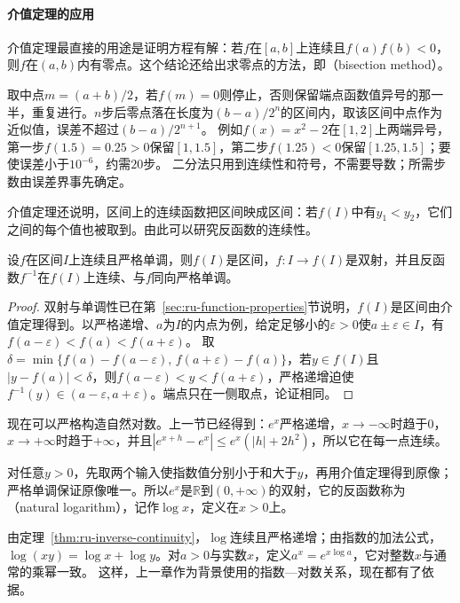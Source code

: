 \paragraph{介值定理的应用}
介值定理最直接的用途是证明方程有解：若$f$在$[a,b]$上连续且$f(a)f(b)<0$，则$f$在$(a,b)$内有零点。这个结论还给出求零点的方法，即（bisection method）。

取中点$m=(a+b)/2$，若$f(m)=0$则停止，否则保留端点函数值异号的那一半，重复进行。$n$步后零点落在长度为$(b-a)/2^n$的区间内，取该区间中点作为近似值，误差不超过$(b-a)/2^{n+1}$。
例如$f(x)=x^2-2$在$[1,2]$上两端异号，第一步$f(1.5)=0.25>0$保留$[1,1.5]$，第二步$f(1.25)<0$保留$[1.25,1.5]$；要使误差小于$10^{-6}$，约需$20$步。
二分法只用到连续性和符号，不需要导数；所需步数由误差界事先确定。

介值定理还说明，区间上的连续函数把区间映成区间：若$f(I)$中有$y_1<y_2$，它们之间的每个值也被取到。由此可以研究反函数的连续性。
\begin{theorem}[严格单调连续函数的反函数]
\label{thm:ru-inverse-continuity}
\label{sec:analysis-inverse-continuity}
设$f$在区间$I$上连续且严格单调，则$f(I)$是区间，$f:I\to f(I)$是双射，并且反函数$f^{-1}$在$f(I)$上连续、与$f$同向严格单调。
\end{theorem}
\begin{proof}
双射与单调性已在第~\ref{sec:ru-function-properties}节说明，$f(I)$是区间由介值定理得到。以严格递增、$a$为$I$的内点为例，给定足够小的$\varepsilon>0$使$a\pm\varepsilon\in I$，有$f(a-\varepsilon)<f(a)<f(a+\varepsilon)$。
取$\delta=\min\{f(a)-f(a-\varepsilon),\,f(a+\varepsilon)-f(a)\}$，若$y\in f(I)$且$|y-f(a)|<\delta$，则$f(a-\varepsilon)<y<f(a+\varepsilon)$，严格递增迫使$f^{-1}(y)\in(a-\varepsilon,a+\varepsilon)$。端点只在一侧取点，论证相同。
\end{proof}

现在可以严格构造自然对数。上一节已经得到：$e^x$严格递增，$x\to-\infty$时趋于$0$，$x\to+\infty$时趋于$+\infty$，并且$|e^{x+h}-e^x|\leq e^x(|h|+2h^2)$，所以它在每一点连续。

对任意$y>0$，先取两个输入使指数值分别小于和大于$y$，再用介值定理得到原像；严格单调保证原像唯一。所以$e^x$是$\mathbb R$到$(0,+\infty)$的双射，它的反函数称为（natural logarithm），记作$\log x$，定义在$x>0$上。

由定理~\ref{thm:ru-inverse-continuity}，$\log$连续且严格递增；由指数的加法公式，$\log(xy)=\log x+\log y$。对$a>0$与实数$x$，定义$a^x=e^{x\log a}$，它对整数$x$与通常的乘幂一致。
这样，上一章作为背景使用的指数—对数关系，现在都有了依据。


